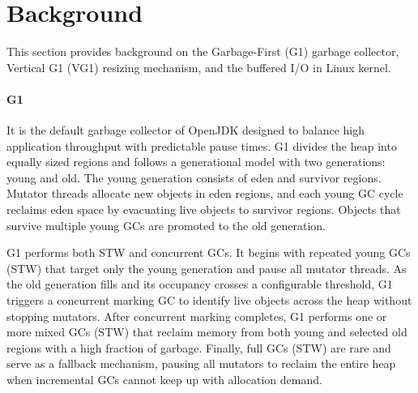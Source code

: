 \section{Background}


This section provides background on the Garbage-First (G1) garbage collector, Vertical G1 (VG1) resizing mechanism, and the buffered I/O in Linux kernel.

\paragraph{\textbf{G1}}
It is the default garbage collector of OpenJDK designed to balance high application throughput with predictable pause times.
G1 divides the heap into equally sized regions and follows a generational model with two generations: young and old.
The young generation consists of eden and survivor regions.
Mutator threads allocate new objects in eden regions, and each young GC cycle reclaims eden space by evacuating live objects to survivor regions.
Objects that survive multiple young GCs are promoted to the old generation.

G1 performs both STW and concurrent GCs.
It begins with repeated young GCs (STW) that target only the young generation and pause all mutator threads.
As the old generation fills and its occupancy crosses a configurable threshold, G1 triggers a concurrent marking GC to identify live objects across the heap without stopping mutators.
After concurrent marking completes, G1 performs one or more mixed GCs (STW) that reclaim memory from both young and selected old regions with a high fraction of garbage.
Finally, full GCs (STW) are rare and serve as a fallback mechanism, pausing all mutators to reclaim the entire heap when incremental GCs cannot keep up with allocation demand.

